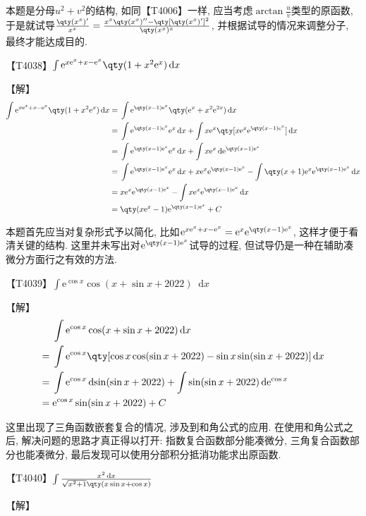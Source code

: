 \documentclass{ctexbook}
\newcommand{\e}{\mathrm{e}}
\newcommand*{\dif}{\mathop{}\!\mathrm{d}}
\begin{document}
{{\kaishu 本题是分母$u^{2}+v^{2}$的结构, 如同【T4006】一样, 应当考虑$\arctan{\frac{u}{v}}$类型的原函数, 于是就试导$\frac{\qty(x^{x})'}{x^{x}}=\frac{x^{x}\qty(x^{x})''-\qty[\qty(x^{x})']^{2}}{\qty(x^{x})^{x}}$, 并根据试导的情况来调整分子, 最终才能达成目的. \par}
【T4038】$\int\e^{x\e^{x}+x-\e^{x}}\qty(1+x^{2}\e^{x})\dif{x}$\par
【解】
\begin{align*}
\int\e^{x\e^{x}+x-\e^{x}}\qty(1+x^{2}\e^{x})\dif{x}={}&\int\e^{\qty(x-1)\e^{x}}\qty(\e^{x}+x^{2}\e^{2x})\dif{x}\\
={}&\int\e^{\qty(x-1)\e^{x}}\e^{x}\dif{x}+\int x\e^{x}\qty[x\e^{x}\e^{\qty(x-1)\e^{x}}]\dif{x}\\
={}&\int\e^{\qty(x-1)\e^{x}}\e^{x}\dif{x}+\int x\e^{x}\dif{\e^{\qty(x-1)\e^{x}}}\\
={}&\int\e^{\qty(x-1)\e^{x}}\e^{x}\dif{x}+x\e^{x}\e^{\qty(x-1)\e^{x}}-\int\qty(x+1)\e^{x}\e^{\qty(x-1)\e^{x}}\dif{x}\\
={}&x\e^{x}\e^{\qty(x-1)\e^{x}}-\int x\e^{x}\e^{\qty(x-1)\e^{x}}\dif{x}\\
={}&\qty(x\e^{x}-1)\e^{\qty(x-1)\e^{x}}+C
\end{align*}\par
{\kaishu 本题首先应当对复杂形式予以简化, 比如$\e^{x\e^{x}+x-\e^{x}}=\e^{x}\e^{\qty(x-1)\e^{x}}$, 这样才便于看清关键的结构. 这里并未写出对$\e^{\qty(x-1)\e^{x}}$试导的过程, 但试导仍是一种在辅助凑微分方面行之有效的方法. \par}
【T4039】$\int\e^{\cos{x}}\cos(x+\sin{x}+2022)\dif{x}$\par
【解】
\begin{align*}
{}&\int\e^{\cos{x}}\cos(x+\sin{x}+2022)\dif{x}\\
={}&\int\e^{\cos{x}}\qty[\cos{x}\cos(\sin{x}+2022)-\sin{x}\sin(\sin{x}+2022)]\dif{x}\\
={}&\int\e^{\cos{x}}\dif{\sin(\sin{x}+2022)}+\int\sin(\sin{x}+2022)\dif{\e^{\cos{x}}}\\
={}&\e^{\cos{x}}\sin(\sin{x}+2022)+C
\end{align*}\par
{\kaishu 这里出现了三角函数嵌套复合的情况, 涉及到和角公式的应用. 在使用和角公式之后, 解决问题的思路才真正得以打开: 指数复合函数部分能凑微分, 三角复合函数部分也能凑微分, 最后发现可以使用分部积分抵消功能求出原函数. \par}
【T4040】$\int\frac{x^{2}\dif{x}}{\sqrt{x^{2}+1}\qty(x\sin{x}+\cos{x})}$\par
【解】
\begin{align*}

\end{align*}}
\end{document}
